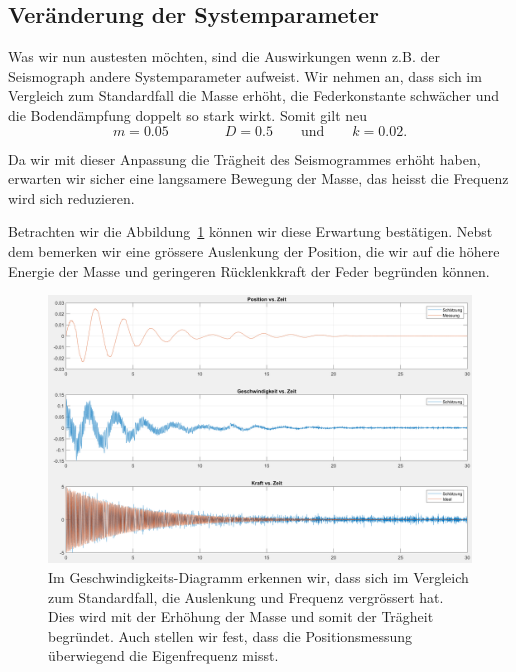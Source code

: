 \subsection{Veränderung der Systemparameter}
Was wir nun austesten möchten, sind die Auswirkungen wenn z.B. der Seismograph andere Systemparameter aufweist.
Wir nehmen an, dass sich im Vergleich zum Standardfall die Masse erhöht, die Federkonstante schwächer und die Bodendämpfung doppelt so stark wirkt.
Somit gilt neu
\[
m = 0.05
\qquad \qquad
D = 0.5
\qquad \text{und} \qquad
k = 0.02.
\]

Da wir mit dieser Anpassung die Trägheit des Seismogrammes erhöht haben, erwarten wir sicher eine langsamere Bewegung der Masse, das heisst die Frequenz wird sich reduzieren.

Betrachten wir die Abbildung~\ref{erdbeben:fig:systemparameter-geaendert} können wir diese Erwartung bestätigen.
Nebst dem bemerken wir eine grössere Auslenkung der Position, die wir auf die höhere Energie der Masse und geringeren Rücklenkkraft der Feder begründen können.

\begin{figure}
	\begin{center}
		\includegraphics[width=\linewidth,keepaspectratio]{papers/erdbeben/Systemparameter_geaendert_2.PNG}
		\caption{Im Geschwindigkeits-Diagramm erkennen wir, dass sich im Vergleich zum Standardfall, die Auslenkung und Frequenz vergrössert hat. Dies wird mit der Erhöhung der Masse und somit der Trägheit begründet. Auch stellen wir fest, dass die Positionsmessung überwiegend die Eigenfrequenz misst.}
    \label{erdbeben:fig:systemparameter-geaendert}
	\end{center}
\end{figure}


